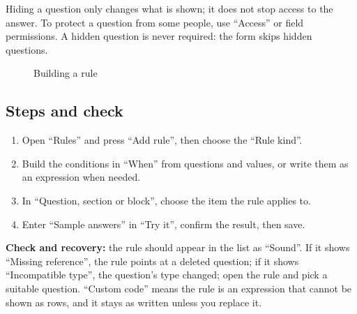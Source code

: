 \begin{rcwarn}
Hiding a question only changes what is shown; it does not stop access to the answer. To protect a question from some people, use “Access” or field permissions. A hidden question is never required: the form skips hidden questions.
\end{rcwarn}

\begin{figure}[H]
\centering
{}
\rclegend
\caption{Building a rule}
\label{fig:builder-forms-rules-flow}
\end{figure}

\subsection{Steps and check}
\begin{enumerate}
\item Open “Rules” and press “Add rule”, then choose the “Rule kind”.
\item Build the conditions in “When” from questions and values, or write them as an expression when needed.
\item In “Question, section or block”, choose the item the rule applies to.
\item Enter “Sample answers” in “Try it”, confirm the result, then save.
\end{enumerate}

\textbf{Check and recovery:} the rule should appear in the list as “Sound”. If it shows “Missing reference”, the rule points at a deleted question; if it shows “Incompatible type”, the question's type changed; open the rule and pick a suitable question. “Custom code” means the rule is an expression that cannot be shown as rows, and it stays as written unless you replace it.

